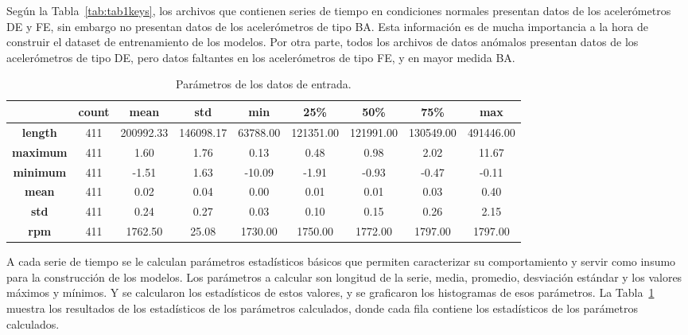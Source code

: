 \documentclass[11pt,a4paper,spanish]{book}
\numberwithin{equation}{chapter}
\numberwithin{figure}{chapter}
\begin{document}
Según la Tabla~\ref{tab:tab1keys}, los archivos que contienen series de tiempo en condiciones normales presentan datos de los acelerómetros DE y FE, sin embargo no presentan datos de los acelerómetros de tipo BA. Esta información es de mucha importancia a la hora de construir el dataset de entrenamiento de los modelos. Por otra parte, todos los archivos de datos anómalos presentan datos de los acelerómetros de tipo DE, pero datos faltantes en los acelerómetros de tipo FE, y en mayor medida BA. 


\begin{table}[h]
\centering
\renewcommand{\arraystretch}{1.2}
\begin{tabular}{|c|c|c|c|c|c|c|c|c|}
    \hline
    \textbf{ } & \textbf{count} & \textbf{mean} & \textbf{std} & \textbf{min} & \textbf{25\%} & \textbf{50\%} & \textbf{75\%} & \textbf{max} \\
    \hline
    \textbf{length} & 411 & 200992.33 & 146098.17 & 63788.00 & 121351.00 & 121991.00 & 130549.00 & 491446.00 \\
    \hline
    \textbf{maximum} & 411 & 1.60 & 1.76 & 0.13 & 0.48 & 0.98 & 2.02 & 11.67 \\
    \hline
    \textbf{minimum} & 411 & -1.51 & 1.63 & -10.09 & -1.91 & -0.93 & -0.47 & -0.11 \\
    \hline
    \textbf{mean} & 411 & 0.02 & 0.04 & 0.00 & 0.01 & 0.01 & 0.03 & 0.40 \\
    \hline
    \textbf{std} & 411 & 0.24 & 0.27 & 0.03 & 0.10 & 0.15 & 0.26 & 2.15 \\
    \hline
    \textbf{rpm} & 411 & 1762.50 & 25.08 & 1730.00 & 1750.00 & 1772.00 & 1797.00 & 1797.00 \\
    \hline
\end{tabular}
\caption{Parámetros de los datos de entrada. }
\label{tab:stats}
\end{table}


A cada serie de tiempo se le calculan parámetros estadísticos básicos que permiten caracterizar su comportamiento y servir como insumo para la construcción de los modelos. Los parámetros a calcular son longitud de la serie, media, promedio, desviación estándar y los valores máximos y mínimos. Y se calcularon los estadísticos de estos valores, y se graficaron los histogramas de esos parámetros. La Tabla~\ref{tab:stats} muestra los resultados de los estadísticos de los parámetros calculados, donde cada fila contiene los estadísticos de los parámetros calculados. 
\end{document}
